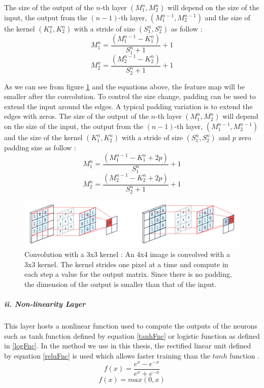 The size of the output of the $n$-th layer $(M_1^n, M_2^n)$ will depend on the size of the input, the output from the $(n-1)$-th layer, $(M_1^{n-1}, M_2^{n-1})$ and the size of the kernel $(K_1^n, K_2^n)$ with a stride of size $(S_1^n, S_2^n)$ as follow \cite{flexHighCNN}:
\begin{equation}
			M_1^n = \frac{\left(M_1^{n-1} - K_1^n\right)}{S_1^n + 1} + 1 
\end{equation}
\begin{equation}
			M_2^n = \frac{\left(M_2^{n-1} - K_2^n\right)}{S_2^n + 1} + 1 
\end{equation}

As we can see from figure \ref{fig:conv} and the equations above, the feature map will be smaller after the convolution. To control the size change, padding can be used to extend the input around the edges. A typical padding variation is to extend the edges with zeros. The size of the output of the $n$-th layer $(M_1^n, M_2^n)$ will depend on the size of the input, the output from the $(n-1)$-th layer, $(M_1^{n-1}, M_2^{n-1})$ and the size of the kernel $(K_1^n, K_2^n)$ with a stride of size $(S_1^n, S_2^n)$ and $p$ zero padding size as follow \cite{convArith}:
\begin{equation}
			M_1^n = \frac{\left(M_1^{n-1} - K_1^n + 2p\right)}{S_1^n} + 1 
\end{equation}
\begin{equation}
			M_2^n = \frac{\left(M_2^{n-1} - K_2^n  + 2p\right)}{S_2^n + 1} + 1 
\end{equation}


\begin{figure}[tbh]
  \centering
    \includegraphics[width=\linewidth]{abbildungen/conv.png}
  \caption{Convolution with a 3x3 kernel \cite{fig:conv}: An 4x4 image is convolved with a 3x3 kernel. The kernel strides one pixel at a time and compute in each step a value for the output matrix. Since there is no padding, the dimension of the output is smaller than that of the input.} 
  \label{fig:conv} 
\end{figure}

\subparagraph*{ii. Non-linearity Layer}This layer hosts a nonlinear function used to compute the outputs of the neurons such as tanh function defined by equation \eqref{tanhFnc} or logistic function as defined in \eqref{logFnc}. In the method we use in this thesis, the rectified linear unit \cite{reluICML} defined by equation \eqref{reluFnc} is used which allows faster training than the $tanh$ function \cite{imgNet}. 
	\begin{equation} \label{tanhFnc}
			f(x) = \frac{e^x - e^{-x}}{e^x + e^{-x}}
	\end{equation}
	\begin{equation} \label{reluFnc}
			f(x) =  max(0, x)
	\end{equation}

